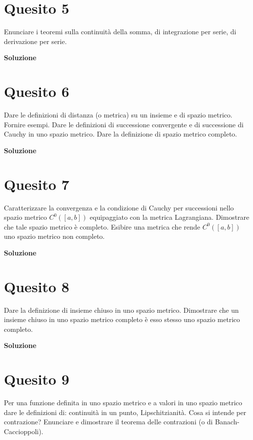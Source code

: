 \section*{Quesito 5}
Enunciare i teoremi sulla continuità della somma, di integrazione per serie, di
derivazione per serie.

\medskip
\begin{large}
\textbf{Soluzione}
\end{large}


\section*{Quesito 6}
Dare le definizioni di distanza (o metrica) su un insieme e di spazio metrico.
Fornire esempi. Dare le definizioni di successione convergente e di successione di Cauchy
in uno spazio metrico. Dare la definizione di spazio metrico completo.

\medskip
\begin{large}
\textbf{Soluzione}
\end{large}


\section*{Quesito 7}
Caratterizzare la convergenza e la condizione di Cauchy per successioni nello
spazio metrico $C^0([a, b])$ equipaggiato con la metrica Lagrangiana. Dimostrare che tale
spazio metrico è completo. Esibire una metrica che rende $C^0([a, b])$ uno spazio metrico
non completo.

\medskip
\begin{large}
\textbf{Soluzione}
\end{large}


\section*{Quesito 8}
Dare la definizione di insieme chiuso in uno spazio metrico. Dimostrare che un
insieme chiuso in uno spazio metrico completo è esso stesso uno spazio metrico completo.

\medskip
\begin{large}
\textbf{Soluzione}
\end{large}


\section*{Quesito 9}
Per una funzione definita in uno spazio metrico e a valori in uno spazio metrico
dare le definizioni di: continuità in un punto, Lipschitzianità. Cosa si intende per contrazione? Enunciare e dimostrare il teorema delle contrazioni (o di Banach-Caccioppoli).

